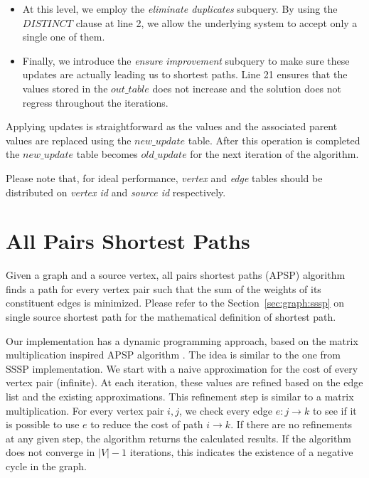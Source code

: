\begin{itemize}
\item At this level, we employ the \emph{eliminate duplicates} subquery. By
using the $DISTINCT$ clause at line 2, we allow the underlying system to
accept only a single one of them.

\item Finally, we introduce the \emph{ensure improvement} subquery to make
sure these updates are actually leading us to shortest paths. Line 21 ensures
that the values stored in the $out\_table$ does not increase and the solution
does not regress throughout the iterations.
\end{itemize}

Applying updates is straightforward as the values and the associated parent
values are replaced using the $new\_update$ table. After this operation is
completed the $new\_update$ table becomes $old\_update$ for the next iteration
of the algorithm.

Please note that, for ideal performance, \emph{vertex} and \emph{edge} tables
should be distributed on \emph{vertex id} and \emph{source id} respectively.

\section{All Pairs Shortest Paths} \label{sec:graph:apsp}

Given a graph and a source vertex, all pairs shortest paths (APSP) algorithm
finds a path for every vertex pair such that the sum of the weights of its
constituent edges is minimized. Please refer to the
Section~\ref{sec:graph:sssp} on single source shortest path for the
mathematical definition of shortest path.

Our implementation has a dynamic programming approach, based on the matrix
multiplication inspired APSP algorithm \cite{apsp}. The idea is similar to
the one from SSSP implementation. We start with a naive approximation for the
cost of every vertex pair (infinite). At each iteration, these values are
refined based on the edge list and the existing approximations. This
refinement step is similar to a matrix multiplication. For every vertex pair
$i,j$, we check every edge $e: j \rightarrow k$ to see if it is possible to
use $e$ to reduce the cost of path $i \rightarrow k$. If there are no
refinements at any given step, the algorithm returns the calculated results.
If the algorithm does not converge in $|V|-1$ iterations, this indicates the
existence of a negative cycle in the graph.


